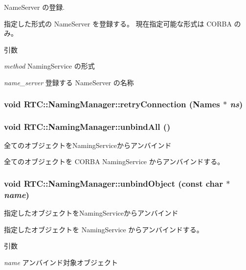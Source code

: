 NameServer の登録. 

指定した形式の NameServer を登録する。 現在指定可能な形式は CORBA のみ。


\begin{DoxyParams}{引数}
\item[{\em method}]NamingService の形式 \item[{\em name\_\-server}]登録する NameServer の名称 \end{DoxyParams}
\subsubsection[{retryConnection}]{\setlength{\rightskip}{0pt plus 5cm}void RTC::NamingManager::retryConnection ({\bf Names} $\ast$ {\em ns})\hspace{0.3cm}{\ttfamily  [protected]}}\label{classRTC_1_1NamingManager_afd3abcbc1eb01392b58f9f0b2c160736}
\subsubsection[{unbindAll}]{\setlength{\rightskip}{0pt plus 5cm}void RTC::NamingManager::unbindAll ()}\label{classRTC_1_1NamingManager_ade0902fd897f9b4e8c37a2f6fba8d76c}


全てのオブジェクトをNamingServiceからアンバインド 

全てのオブジェクトを CORBA NamingService からアンバインドする。 
\subsubsection[{unbindObject}]{\setlength{\rightskip}{0pt plus 5cm}void RTC::NamingManager::unbindObject (const char $\ast$ {\em name})}\label{classRTC_1_1NamingManager_a3fcfc7666a199f3fd89529a1bc8df3da}


指定したオブジェクトをNamingServiceからアンバインド 

指定したオブジェクトを NamingService からアンバインドする。


\begin{DoxyParams}{引数}
\item[{\em name}]アンバインド対象オブジェクト \end{DoxyParams}
